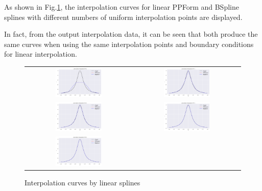 \documentclass[a4paper]{article}
\begin{document}
\begin{sloppypar}
As shown in Fig.\ref{fig:A_linear}, the interpolation curves for linear PPForm
and BSpline splines with different numbers of uniform interpolation points are
displayed.

In fact, from the output interpolation data, it can be seen that both produce
the same curves when using the same interpolation points and boundary
conditions for linear interpolation.

\begin{figure}[H]
  \centering
  \begin{tabular}{cc}
    \includegraphics[width=0.45\textwidth]{../figure/problemA/linear_N6.png}  &
    \includegraphics[width=0.45\textwidth]{../figure/problemA/linear_N11.png}   \\
    \includegraphics[width=0.45\textwidth]{../figure/problemA/linear_N21.png} &
    \includegraphics[width=0.45\textwidth]{../figure/problemA/linear_N41.png}   \\
    \includegraphics[width=0.45\textwidth]{../figure/problemA/linear_N81.png} &
  \end{tabular}
  \renewcommand{\figurename}{Fig.}
  \caption{Interpolation curves by linear splines}
  \label{fig:A_linear}
\end{figure}


\end{sloppypar}
\end{document}
